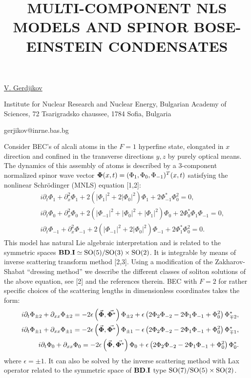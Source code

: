 \title{MULTI-COMPONENT NLS MODELS AND SPINOR BOSE-EINSTEIN \mbox{CONDENSATES}}

\underline{V. Gerdjikov} 

{\normalsize{\vspace{-4mm}
Institute for Nuclear Research and Nuclear Energy, Bulgarian Academy
of Sciences, 72 Tsarigradsko chaussee, 1784 Sofia, Bulgaria

\email gerjikov@inrne.bas.bg}}

Consider BEC's of alcali atoms in the $F=1$ hyperfine state,
elongated in $x$ direction and confined in the transverse directions
$y,z$ by purely optical means. The dynamics of this assembly of
atoms is described by a  3-component normalized spinor wave vector
${\bf\Phi}(x,t)=(\Phi_1,\Phi_0 ,\Phi_{-1})^T(x,t)$ satisfying the
nonlinear Schr\"{o}dinger (MNLS) equation [1,2]:
\begin{eqnarray}
&& i\partial_{t}\Phi_{1}+\partial^{2}_{x}\Phi_{1}+2\left(|\Phi_{1}|^2
+2|\Phi_{0}|^2\right)\Phi_{1} +2\Phi_{-1}^{*}\Phi_{0}^2=0, \nonumber\\
&& i\partial_{t}\Phi_{0}+\partial^{2}_{x}
\Phi_{0}+2\left(|\Phi_{-1}|^2
+ |\Phi_{0}|^2+|\Phi_{1}|^2\right)\Phi_{0} +2\Phi_{0}^{*}\Phi_{1}\Phi_{-1}=0,\nonumber \\
&& i\partial_{t}\Phi_{-1}+\partial^{2}_{x}
\Phi_{-1}+2\left(|\Phi_{-1}|^2+ 2|\Phi_{0}|^2\right)\Phi_{-1}
+2\Phi_{1}^{*}\Phi_{0}^2=0. \nonumber
\end{eqnarray}
This  model has natural Lie algebraic interpretation and is related
to the symmetric spaces ${\bf BD.I}\simeq {\rm SO(5)}/{\rm
SO(3)\times SO(2)}$. It is integrable by means of inverse scattering
transform method [2,3]. Using a modification of the Zakharov-Shabat
``dressing method'' we describe the different classes of soliton
solutions of the above equation, see [2] and the references therein.
BEC with $F=2$ for rather specific choices of the scattering lengths
in dimensionless coordinates takes the form:
\begin{eqnarray}
&&i\partial_t\Phi_{\pm 2}+\partial_{xx}\Phi_{\pm 2}= -2\epsilon
\left(\vec{{\bf \Phi}},\vec{{\bf \Phi^{*}}}\right) \Phi_{\pm 2} +\epsilon
\left(2\Phi_{2}\Phi_{-2}-2 \Phi_{1}\Phi_{-1}+\Phi_{0}^2\right) \Phi_{\mp
2}^*,\nonumber \\
&&i\partial_t\Phi_{\pm 1}+\partial_{xx}\Phi_{\pm 1}= -2\epsilon
\left(\vec{{\bf \Phi}},\vec{{\bf \Phi^{*}}}\right) \Phi_{\pm 1} -\epsilon
\left(2\Phi_{2}\Phi_{-2}-2 \Phi_{1}\Phi_{-1}+\Phi_{0}^2\right) \Phi_{\mp
1}^*,\nonumber \\
&&i\partial_t\Phi_{0}+\partial_{xx}\Phi_{0}=  -2\epsilon
\left(\vec{{\bf \Phi}},\vec{{\bf \Phi^{*}}}\right) \Phi_{0} +\epsilon
\left(2\Phi_{2}\Phi_{-2}-2 \Phi_{1}\Phi_{-1}+\Phi_{0}^2\right)
\Phi_{0}^*.\nonumber
\end{eqnarray}
where $\epsilon =\pm 1$. It can also be solved by the inverse
scattering method with Lax operator related to the symmetric space
of ${\bf BD.I}$ type $ {\rm SO(7)}/{\rm SO(5)\times SO(2)}$.



